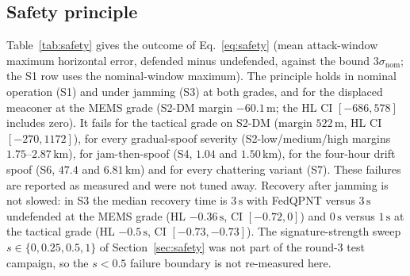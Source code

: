 \documentclass[journal]{IEEEtran}
\begin{document}
\subsection{Safety principle}
Table~\ref{tab:safety} gives the outcome of Eq.~\eqref{eq:safety} (mean attack-window maximum horizontal error, defended minus undefended, against the bound $3\sigma_{\mathrm{nom}}$; the S1 row uses the nominal-window maximum). The principle holds in nominal operation (S1) and under jamming (S3) at both grades, and for the displaced meaconer at the MEMS grade (S2-DM margin $-60.1\,\mathrm{m}$; the HL CI $[-686, 578]$ includes zero). It fails for the tactical grade on S2-DM (margin $522\,\mathrm{m}$, HL CI $[-270, 1172]$), for every gradual-spoof severity (S2-low/medium/high margins $1.75$--$2.87\,\mathrm{km}$), for jam-then-spoof (S4, $1.04$ and $1.50\,\mathrm{km}$), for the four-hour drift spoof (S6, $47.4$ and $6.81\,\mathrm{km}$) and for every chattering variant (S7). These failures are reported as measured and were not tuned away. Recovery after jamming is not slowed: in S3 the median recovery time is $3\,\mathrm{s}$ with FedQPNT versus $3\,\mathrm{s}$ undefended at the MEMS grade (HL $-0.36\,\mathrm{s}$, CI $[-0.72, 0]$) and $0\,\mathrm{s}$ versus $1\,\mathrm{s}$ at the tactical grade (HL $-0.5\,\mathrm{s}$, CI $[-0.73,-0.73]$). The signature-strength sweep $s\in\{0,0.25,0.5,1\}$ of Section~\ref{sec:safety} was not part of the round-3 test campaign, so the $s<0.5$ failure boundary is not re-measured here.
\end{document}
